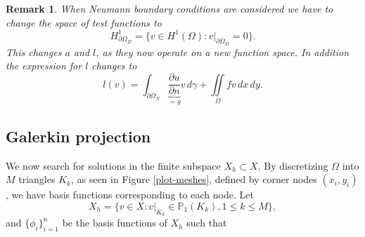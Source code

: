 \documentclass[a4paper,english]{elsarticle}%
\newcommand{\restr}[2]{\ensuremath{\left.#1\right|_{#2}}}
\newtheorem*{remark}{Remark}
\begin{document}
\begin{remark}
    When Neumann boundary conditions are considered we have to change the space of test functions to 
    \begin{equation}
        H^1_{\partial \Omega_D } = \{v \in H^1(\Omega):\restr{v}{\partial \Omega_D }=0 \}.
    \end{equation}
    This changes $a$ and $l$, as they now operate on a new function space. In addition the expression for $l$ changes to
    \begin{equation}
        l(v) = \int_{\partial \Omega_N} \underbrace{ \frac{\partial u}{\partial n}}_{=g} v \, d\gamma + \iint\limits_{\Omega} f v  \, dx \, dy.
        \label{neumann-conditions}
    \end{equation}
\end{remark}

\subsection{Galerkin projection}

We now search for solutions in the finite subspace $X_h \subset X$. 
By discretizing $\Omega$ into $M$ triangles $K_k$, as seen in Figure \ref{plot-meshes}, defined by corner nodes $(x_i,y_i)$, we have basis functions corresponding to each node.
Let 
\begin{equation*}
X_h = \{ v \in X : v|_{K_k} \in \mathbb{P}_1 (K_k),1\leq k\leq M \},
\end{equation*}
and $\{\phi_i\}_{i=1}^n$ be the basis functions of $X_h$ such that
\end{document}
